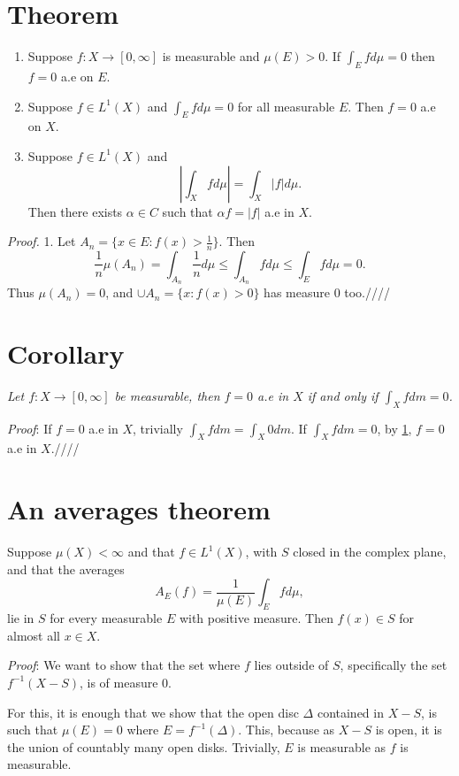 \documentclass[oneside]{book}
\begin{document}
\section{Theorem}\label{fiszeroforintzero}
\begin{enumerate}
    \item Suppose $f:X\rightarrow [0,\infty]$ is measurable and $\mu(E)> 0$. If $\int_E fd\mu=0$ then $f=0$ a.e on $E$.
    \item Suppose $f\in L^1(X)$ and $\int_Efd\mu = 0$ for all measurable $E$. Then $f=0$ a.e on $X$.
    \item Suppose $f\in L^1(X)$ and
    $$\left|\int_X fd\mu \right| = \int_X |f|d\mu.$$
    Then there exists $\alpha\in C$ such that $\alpha f = |f|$
    a.e in $X$.
\end{enumerate}

\emph{Proof.}
1. Let $A_n=\{x\in E: f(x)>\frac{1}{n}\}$. Then
$$\frac{1}{n}\mu(A_n)=\int_{A_n}\frac{1}{n}d\mu
\leq \int_{A_n}fd\mu \leq \int_E fd\mu = 0.$$
Thus $\mu(A_n)=0$, and $\cup A_n = \{x:f(x)>0\}$ has measure
$0$ too.\hfill ////

\section{Corollary}\label{fzeroiffintzero}
\emph{Let $f:X\rightarrow [0,\infty]$ be measurable,
then $f=0$ a.e in $X$ if and only if $\int_X fdm = 0$.}

\emph{Proof}: If $f=0$ a.e in $X$, trivially $\int_X fdm =\int_X 0dm$.
If $\int_X fdm = 0$, by \ref{fiszeroforintzero},
$f=0$ a.e in $X$.\hfill ////

\section{An averages theorem}
Suppose $\mu(X)<\infty$ and that $f\in L^1(X)$, with $S$
closed in the complex plane, 
and that the averages
$$A_E(f) = \frac{1}{\mu(E)}\int_E fd\mu,$$
lie in $S$ for every measurable $E$ with positive measure.
Then $f(x)\in S$ for almost all $x\in X$.

\emph{Proof}: We want to show that the set where $f$ lies
outside of $S$, specifically the set $f^{-1}(X-S)$,
is of measure $0$.

For this, it is enough that we show that the open disc $\Delta$
contained in $X-S$, is such that $\mu(E)=0$ where
$E=f^{-1}(\Delta)$.
This, because as $X-S$ is open, it is the
union of countably many open disks.
Trivially, $E$ is measurable as $f$ is measurable.
\end{document}
